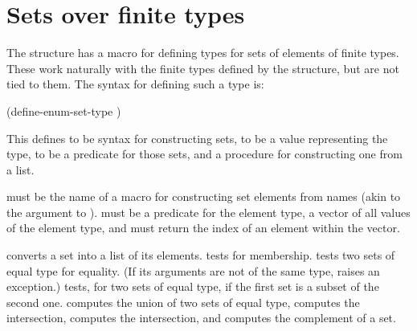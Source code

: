\section{Sets over finite types}
\label{sets-finite-types}

The structure  has a macro for defining types for sets
of elements of finite types.  These work naturally with the finite
types defined by the  structure, but are not tied
to them.  The syntax for defining such a type is:

\begin{example}
(define-enum-set-type    
      )
\end{example}
%
This defines  to be syntax for constructing sets,
 to be a value representing the type,
 to be a predicate for those sets, and
 a procedure for constructing one from a list.

 must be the name of a macro for constructing set
elements from names (akin to the  argument to
).   must be a
predicate for the element type,  a vector of all
values of the element type, and  must return
the index of an element within the  vector.

\begin{protos}
\end{protos}
%
 converts a set into a list of its elements.
 tests for membership.   tests
two sets of equal type for equality.  (If its arguments are not of the
same type,  raises an exception.)
 tests, for two sets of equal type, 
if the first set is a subset of the second one.
 computes the union of two sets of equal type,
 computes the intersection, 
 computes the intersection, 
and
 computes the complement of a set.


